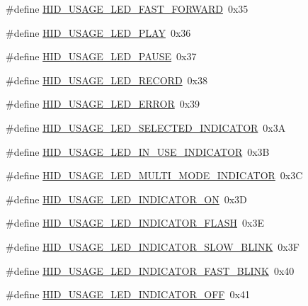 \begin{DoxyCompactItemize}
\#define \hyperlink{group__USBD__HID_ga3a4a93c2db00474a8353a653457462ac}{H\+I\+D\+\_\+\+U\+S\+A\+G\+E\+\_\+\+L\+E\+D\+\_\+\+F\+A\+S\+T\+\_\+\+F\+O\+R\+W\+A\+RD}~0x35
\item 
\#define \hyperlink{group__USBD__HID_ga0e1d5a888297641ba60e0d339384b6e3}{H\+I\+D\+\_\+\+U\+S\+A\+G\+E\+\_\+\+L\+E\+D\+\_\+\+P\+L\+AY}~0x36
\item 
\#define \hyperlink{group__USBD__HID_ga661f4369dd90713ad94634190e4e0014}{H\+I\+D\+\_\+\+U\+S\+A\+G\+E\+\_\+\+L\+E\+D\+\_\+\+P\+A\+U\+SE}~0x37
\item 
\#define \hyperlink{group__USBD__HID_ga75cd4f041b28d055b64f127c45d5c1a6}{H\+I\+D\+\_\+\+U\+S\+A\+G\+E\+\_\+\+L\+E\+D\+\_\+\+R\+E\+C\+O\+RD}~0x38
\item 
\#define \hyperlink{group__USBD__HID_gacf4628b5d2ec9d62ac2fe7e73d58c692}{H\+I\+D\+\_\+\+U\+S\+A\+G\+E\+\_\+\+L\+E\+D\+\_\+\+E\+R\+R\+OR}~0x39
\item 
\#define \hyperlink{group__USBD__HID_ga3eab7def711983efe709356bb64ee3f7}{H\+I\+D\+\_\+\+U\+S\+A\+G\+E\+\_\+\+L\+E\+D\+\_\+\+S\+E\+L\+E\+C\+T\+E\+D\+\_\+\+I\+N\+D\+I\+C\+A\+T\+OR}~0x3A
\item 
\#define \hyperlink{group__USBD__HID_ga5989c594ce7bfd94817de1ac6ed8c291}{H\+I\+D\+\_\+\+U\+S\+A\+G\+E\+\_\+\+L\+E\+D\+\_\+\+I\+N\+\_\+\+U\+S\+E\+\_\+\+I\+N\+D\+I\+C\+A\+T\+OR}~0x3B
\item 
\#define \hyperlink{group__USBD__HID_ga839ad385878569f6a9d3b90d8a38cb14}{H\+I\+D\+\_\+\+U\+S\+A\+G\+E\+\_\+\+L\+E\+D\+\_\+\+M\+U\+L\+T\+I\+\_\+\+M\+O\+D\+E\+\_\+\+I\+N\+D\+I\+C\+A\+T\+OR}~0x3C
\item 
\#define \hyperlink{group__USBD__HID_ga48aae293742fcfc360e51a3a15fde96a}{H\+I\+D\+\_\+\+U\+S\+A\+G\+E\+\_\+\+L\+E\+D\+\_\+\+I\+N\+D\+I\+C\+A\+T\+O\+R\+\_\+\+ON}~0x3D
\item 
\#define \hyperlink{group__USBD__HID_ga4f1b587abec632b31d8635c75b43a803}{H\+I\+D\+\_\+\+U\+S\+A\+G\+E\+\_\+\+L\+E\+D\+\_\+\+I\+N\+D\+I\+C\+A\+T\+O\+R\+\_\+\+F\+L\+A\+SH}~0x3E
\item 
\#define \hyperlink{group__USBD__HID_ga5f0a0abd6759a915a89997b1d7fe006f}{H\+I\+D\+\_\+\+U\+S\+A\+G\+E\+\_\+\+L\+E\+D\+\_\+\+I\+N\+D\+I\+C\+A\+T\+O\+R\+\_\+\+S\+L\+O\+W\+\_\+\+B\+L\+I\+NK}~0x3F
\item 
\#define \hyperlink{group__USBD__HID_ga539ee008fdc26641e2ea9b2fb0065ab8}{H\+I\+D\+\_\+\+U\+S\+A\+G\+E\+\_\+\+L\+E\+D\+\_\+\+I\+N\+D\+I\+C\+A\+T\+O\+R\+\_\+\+F\+A\+S\+T\+\_\+\+B\+L\+I\+NK}~0x40
\item 
\#define \hyperlink{group__USBD__HID_ga9b2b1678ab1dc53fea10cb0bf9d5ceb6}{H\+I\+D\+\_\+\+U\+S\+A\+G\+E\+\_\+\+L\+E\+D\+\_\+\+I\+N\+D\+I\+C\+A\+T\+O\+R\+\_\+\+O\+FF}~0x41

\end{DoxyCompactItemize}
